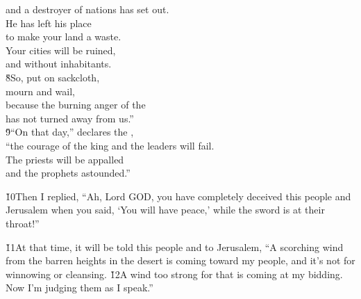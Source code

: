 \begin{poetry}
\poemll    and a destroyer of nations has set out. \\
\poeml He has left his place \\
\poemll    to make your land a waste. \\
\poeml Your cities will be ruined, \\
\poemll    and without inhabitants. \\
\poeml \v{8}So, put on sackcloth, \\
\poemll    mourn and wail, \\
\poeml because the burning anger of the  \\
\poemll    has not turned away from us.'' \\
\poeml \v{9}``On that day,'' declares the , \\
\poemll    ``the courage of the king and the leaders will fail. \\
\poeml The priests will be appalled \\
\poemll    and the prophets astounded.''
\end{poetry}

\v{10}Then I replied, ``Ah, Lord GOD, you have completely deceived this people and Jerusalem when you said, `You will have peace,' while the sword is at their throat!''

\v{11}At that time, it will be told this people and to Jerusalem, ``A scorching wind from the barren heights in the desert is coming toward my people, and it's not for winnowing or cleansing. \v{12}A wind too strong for that is coming at my bidding. Now I'm judging them as I speak.''

